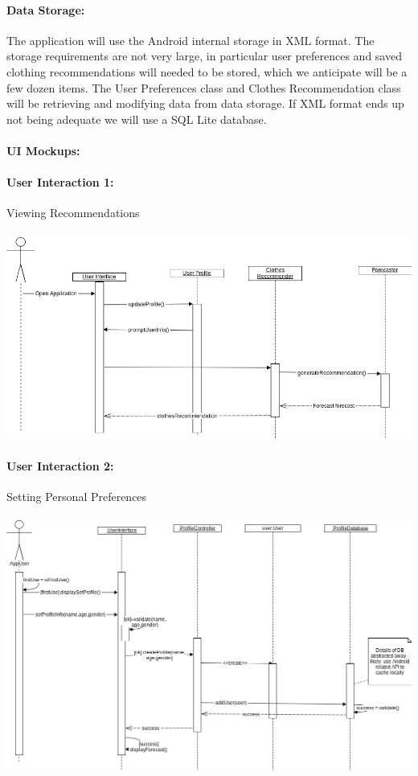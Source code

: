 \documentclass[12pt,a4paper]{article}
\begin{document}
\paragraph{Data Storage:} The application will use the Android internal storage in XML format.
The storage requirements are not very large, in particular user preferences and saved clothing recommendations
will needed to be stored, which we anticipate will be a few dozen items.
The User Preferences class and Clothes Recommendation class will be retrieving and modifying data from data storage.
If XML format ends up not being adequate we will use a SQL Lite database.

\paragraph{UI Mockups:} 

\paragraph{User Interaction 1:} Viewing Recommendations\\\\
\includegraphics[scale=0.5]{us_01_veiwrecs.png}

\paragraph{User Interaction 2:} Setting Personal Preferences\\\\
\includegraphics[scale=0.45]{uc2_settingpersonalprefssequence.png}
\end{document}
